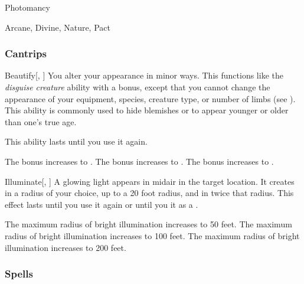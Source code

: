 \newpage
\begin{spellsection}{Photomancy}

\begin{spellheader}
\end{spellheader}


 Arcane, Divine, Nature, Pact

\subsubsection{Cantrips}


\begin{freeability}{Beautify}[, ]
You alter your appearance in minor ways.
This functions like the \textit{disguise creature}  ability with a  bonus, except that you cannot change the appearance of your equipment, species, creature type, or number of limbs (see ).
This ability is commonly used to hide blemishes or to appear younger or older than one's true age.

This ability lasts until you use it again.

\rankline
{} The bonus increases to .
 The bonus increases to .
 The bonus increases to .
\end{freeability}


\begin{freeability}{Illuminate}[, ]
A glowing light appears in midair in the target location.
It creates  in a radius of your choice, up to a 20 foot radius, and  in twice that radius.
This effect lasts until you use it again or until you  it as a .

\rankline
{} The maximum radius of bright illumination increases to 50 feet.
 The maximum radius of bright illumination increases to 100 feet.
 The maximum radius of bright illumination increases to 200 feet.
\end{freeability}

\end{spellsection}


\subsubsection{Spells}


